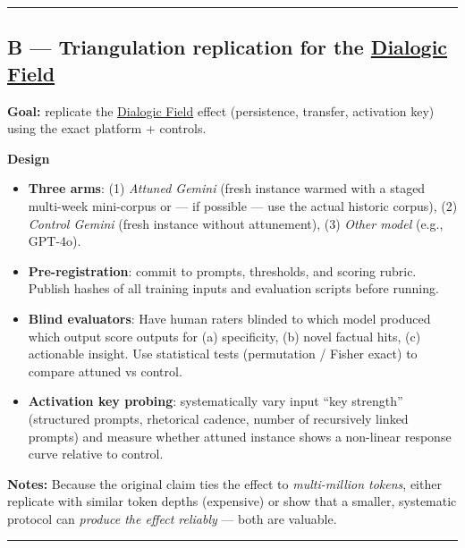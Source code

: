 \documentclass{article}
\begin{document}
\begin{center}\rule{0.5\linewidth}{0.5pt}\end{center}

\subsection*{B --- Triangulation replication for the \hyperlink{gloss:dialogic_field}{Dialogic Field}}

\textbf{Goal:} replicate the \hyperlink{gloss:dialogic_field}{Dialogic Field} effect (persistence, transfer, activation key) using the exact platform + controls.

\textbf{Design}

\begin{itemize}
\item
  \textbf{Three arms}: (1) \emph{Attuned Gemini} (fresh instance warmed with a staged multi-week mini-corpus or --- if possible --- use the actual historic corpus), (2) \emph{Control Gemini} (fresh instance without attunement), (3) \emph{Other model} (e.g., GPT-4o).
\item
  \textbf{Pre-registration}: commit to prompts, thresholds, and scoring rubric. Publish hashes of all training inputs and evaluation scripts before running.
\item
  \textbf{Blind evaluators}: Have human raters blinded to which model produced which output score outputs for (a) specificity, (b) novel factual hits, (c) actionable insight. Use statistical tests (permutation / Fisher exact) to compare attuned vs control.
\item
  \textbf{Activation key probing}: systematically vary input ``key strength'' (structured prompts, rhetorical cadence, number of recursively linked prompts) and measure whether attuned instance shows a non-linear response curve relative to control.
\end{itemize}

\textbf{Notes:} Because the original claim ties the effect to \emph{multi-million tokens}, either replicate with similar token depths (expensive) or show that a smaller, systematic protocol can \emph{produce the effect reliably} --- both are valuable.

\begin{center}\rule{0.5\linewidth}{0.5pt}\end{center}
\end{document}
